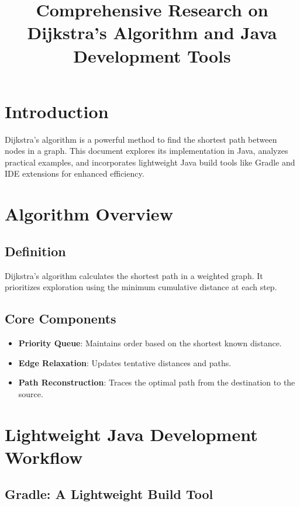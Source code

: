 \documentclass{article}
\title{Comprehensive Research on Dijkstra’s Algorithm and Java Development Tools}
\author{}
\date{}
\begin{document}
\maketitle

\section{Introduction}

Dijkstra’s algorithm is a powerful method to find the shortest path between nodes in a graph. This document explores its implementation in Java, analyzes practical examples, and incorporates lightweight Java build tools like Gradle and IDE extensions for enhanced efficiency.

\section{Algorithm Overview}

\subsection{Definition}

Dijkstra’s algorithm calculates the shortest path in a weighted graph. It prioritizes exploration using the minimum cumulative distance at each step.

\subsection{Core Components}

\begin{itemize}
    \item \textbf{Priority Queue}: Maintains order based on the shortest known distance.
    \item \textbf{Edge Relaxation}: Updates tentative distances and paths.
    \item \textbf{Path Reconstruction}: Traces the optimal path from the destination to the source.
\end{itemize}

\section{Lightweight Java Development Workflow}

\subsection{Gradle: A Lightweight Build Tool}
\end{document}
